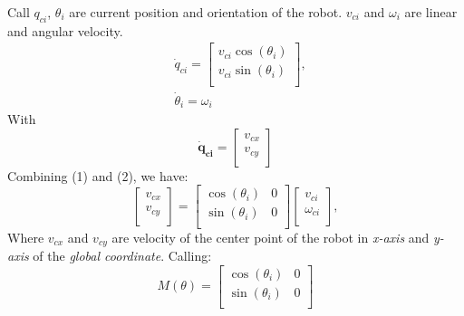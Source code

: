 \documentclass[letterpaper, 10 pt, conference]{ieeeconf}
\begin{document}
Call ${q}_{ci}$, ${\theta}_{i}$ are current position and orientation of the robot. ${v}_{ci}$ and ${\omega}_{i}$ are linear and angular velocity.
\begin{equation}
	\begin{split}
		&\dot{q}_{ci}=\left[
			\begin{array}{c}
			v_{ci}\cos(\theta_{i})\\
			v_{ci}\sin(\theta_{i})\\
			\end{array}
		\right],\\
		&\dot{\theta}_{i}=\omega_{i}
	\end{split}
\end{equation}
With
\begin{equation}
\mathbf{\dot{q}_{ci}}=\left[
		\begin{array}{c}
			v_{cx}\\
			v_{cy}\\
		\end{array}
	\right]
\end{equation}
Combining (1) and (2), we have: 
\begin{equation}
	\left[
		\begin{array}{c}
			v_{cx}\\
			v_{cy}\\
		\end{array}	
	\right]=
	\left[
		\begin{array}{cc}
			\cos(\theta_{i})&{0}\\
			\sin(\theta_{i})&{0}\\
		\end{array}		
	\right]
	\left[
		\begin{array}{c}
			v_{ci}\\
			\omega_{ci}\\
		\end{array}		
	\right],
\end{equation}
Where $v_{cx}$ and $v_{cy}$ are velocity of the center point of the robot in \textit{x-axis} and \textit{y-axis} of the \textit{global coordinate}. 
Calling:
\begin{equation}
{M}(\theta)=\left[\begin{array}{cc}
			\cos(\theta_{i})&{0}\\
			\sin(\theta_{i})&{0}\\
		\end{array}
		\right]
\end{equation}
\end{document}
